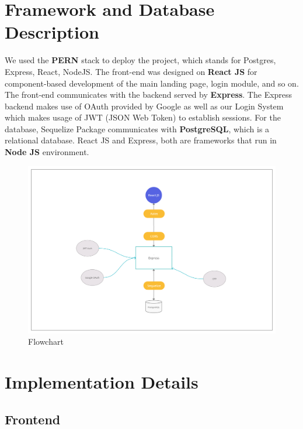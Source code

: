 \documentclass[12pt]{article}
\begin{document}
\section*{\LARGE{Framework and Database Description}}
We used the \textbf{PERN} stack to deploy the project, which stands for Postgres, Express, React, NodeJS.
The front-end was designed on \textbf{React JS} for component-based development of the main landing page, login module, and so on.
The front-end communicates with the backend served by \textbf{Express}. The Express backend makes use of OAuth provided by Google as well as our Login System which makes usage of JWT (JSON Web Token) to establish sessions.
For the database, Sequelize Package communicates with \textbf{PostgreSQL}, which is a relational database. React JS and Express, both are frameworks that run in \textbf{Node JS} environment.

\begin{figure}[H]
\centering
\includegraphics[width=\linewidth]{diagram.png}
\caption{Flowchart}
\end{figure}

\newpage

\section*{\LARGE{Implementation Details}}

\subsection*{\Large{Frontend}}
\end{document}
